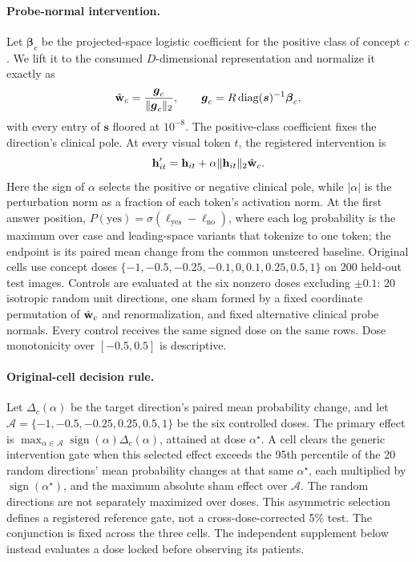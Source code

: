 \documentclass{article}
\begin{document}
\paragraph{Probe-normal intervention.}
Let $\boldsymbol\beta_c$ be the projected-space logistic coefficient for the positive class of concept $c$. We lift it to the consumed $D$-dimensional representation and normalize it exactly as
\begin{equation}
\hat{\mathbf{w}}_c=\frac{\boldsymbol g_c}{\lVert\boldsymbol g_c\rVert_2},\qquad \boldsymbol g_c=R\,\mathrm{diag}(\boldsymbol s)^{-1}\boldsymbol\beta_c ,
\label{eq:seed-lift}
\end{equation}
with every entry of $\boldsymbol s$ floored at $10^{-8}$. The positive-class coefficient fixes the direction's clinical pole. At every visual token $t$, the registered intervention is
\begin{equation}
\mathbf{h}'_{it}=\mathbf{h}_{it}+\alpha\lVert\mathbf{h}_{it}\rVert_2\hat{\mathbf{w}}_c.
\label{eq:seed-intervention}
\end{equation}
Here the sign of $\alpha$ selects the positive or negative clinical pole, while $|\alpha|$ is the perturbation norm as a fraction of each token's activation norm. At the first answer position, $P(\mathrm{yes})=\sigma(\ell_{\mathrm{yes}}-\ell_{\mathrm{no}})$, where each log probability is the maximum over case and leading-space variants that tokenize to one token; the endpoint is its paired mean change from the common unsteered baseline. Original cells use concept doses $\{-1,-0.5,-0.25,-0.1,0,0.1,0.25,0.5,1\}$ on 200 held-out test images. Controls are evaluated at the six nonzero doses excluding $\pm0.1$: 20 isotropic random unit directions, one sham formed by a fixed coordinate permutation of $\hat{\mathbf{w}}_c$ and renormalization, and fixed alternative clinical probe normals. Every control receives the same signed dose on the same rows. Dose monotonicity over $[-0.5,0.5]$ is descriptive.

\paragraph{Original-cell decision rule.}
Let $\Delta_c(\alpha)$ be the target direction's paired mean probability change, and let $\mathcal A=\{-1,-0.5,-0.25,0.25,0.5,1\}$ be the six controlled doses. The primary effect is $\max_{\alpha\in\mathcal A}\operatorname{sign}(\alpha)\Delta_c(\alpha)$, attained at dose $\alpha^\star$. A cell clears the generic intervention gate when this selected effect exceeds the 95th percentile of the 20 random directions' mean probability changes at that same $\alpha^\star$, each multiplied by $\operatorname{sign}(\alpha^\star)$, and the maximum absolute sham effect over $\mathcal A$. The random directions are not separately maximized over doses. This asymmetric selection defines a registered reference gate, not a cross-dose-corrected 5\% test. The conjunction is fixed across the three cells. The independent supplement below instead evaluates a dose locked before observing its patients.
\end{document}
